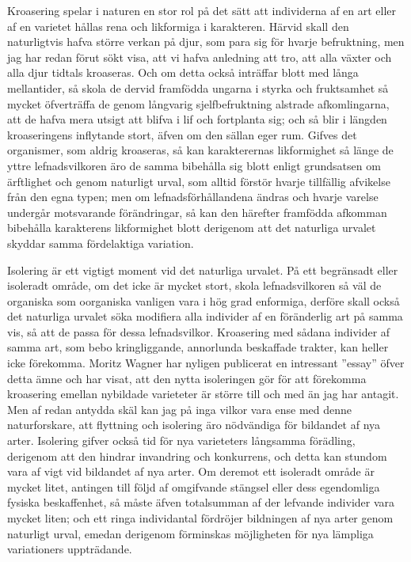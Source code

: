 Kroasering spelar i naturen en stor rol på det sätt att individerna af en art eller af en varietet hållas rena och likformiga i karakteren. Härvid skall den naturligtvis hafva större verkan på djur, som para sig för hvarje befruktning, men jag har redan förut sökt visa, att vi hafva anledning att tro, att alla växter och alla djur tidtals kroaseras. Och om detta också inträffar blott med långa mellantider, så skola de dervid framfödda ungarna i styrka och fruktsamhet så mycket öfverträffa de genom långvarig sjelfbefruktning alstrade afkomlingarna, att de hafva mera utsigt att blifva i lif och fortplanta sig; och så blir i längden kroaseringens inflytande stort, äfven om den sällan eger rum. Gifves det organismer, som aldrig kroaseras, så kan karakterernas likformighet så länge de yttre lefnadsvilkoren äro de samma bibehålla sig blott enligt grundsatsen om ärftlighet och genom naturligt urval, som alltid förstör hvarje tillfällig afvikelse från den egna typen; men om lefnadsförhållandena ändras och hvarje varelse undergår motsvarande förändringar, så kan den härefter framfödda afkomman bibehålla karakterens likformighet blott derigenom att det naturliga urvalet skyddar samma fördelaktiga variation.

Isolering är ett vigtigt moment vid det naturliga urvalet. På ett begränsadt eller isoleradt område, om det icke är mycket stort, skola lefnadsvilkoren så väl de organiska som oorganiska vanligen vara i hög grad enformiga, derföre skall också det naturliga urvalet söka modifiera alla individer af en föränderlig art på samma vis, så att de passa för dessa lefnadsvilkor. Kroasering med sådana individer af samma art, som bebo kringliggande, annorlunda beskaffade trakter, kan heller icke förekomma. Moritz Wagner har nyligen publicerat en intressant ”essay” öfver detta ämne och har visat, att den nytta isoleringen gör för att förekomma kroasering emellan nybildade varieteter är större till och med än jag har antagit. Men af redan antydda skäl kan jag på inga vilkor vara ense med denne naturforskare, att flyttning och isolering äro nödvändiga för bildandet af nya arter. Isolering gifver också tid för nya varieteters långsamma förädling, derigenom att den hindrar invandring och konkurrens, och detta kan stundom vara af vigt vid bildandet af nya arter. Om deremot ett isoleradt område är mycket litet, antingen till följd af omgifvande stängsel eller dess egendomliga fysiska beskaffenhet, så måste äfven totalsumman af der lefvande individer vara mycket liten; och ett ringa individantal fördröjer bildningen af nya arter genom naturligt urval, emedan derigenom förminskas möjligheten för nya lämpliga variationers uppträdande.

